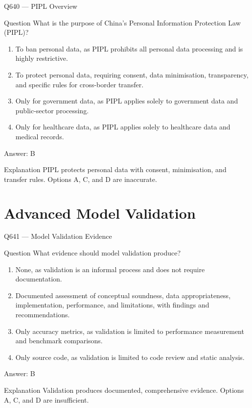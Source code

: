 \documentclass[aspectratio=169,8pt]{beamer}
\begin{document}
	\begin{frame}{Q640 --- PIPL Overview}
		\begin{block}{Question}
			What is the purpose of China's Personal Information Protection Law (PIPL)?
			\begin{enumerate}
				\item To ban personal data, as PIPL prohibits all personal data processing and is highly restrictive.
				\item To protect personal data, requiring consent, data minimisation, transparency, and specific rules for cross-border transfer.
				\item Only for government data, as PIPL applies solely to government data and public-sector processing.
				\item Only for healthcare data, as PIPL applies solely to healthcare data and medical records.
			\end{enumerate}
		\end{block}
		\begin{exampleblock}{Answer: B}\end{exampleblock}
		\begin{block}{Explanation}
			PIPL protects personal data with consent, minimisation, and transfer rules. Options A, C, and D are inaccurate.
		\end{block}
	\end{frame}
	
	\section{Advanced Model Validation}
	
	\begin{frame}{Q641 --- Model Validation Evidence}
		\begin{block}{Question}
			What evidence should model validation produce?
			\begin{enumerate}
				\item None, as validation is an informal process and does not require documentation.
				\item Documented assessment of conceptual soundness, data appropriateness, implementation, performance, and limitations, with findings and recommendations.
				\item Only accuracy metrics, as validation is limited to performance measurement and benchmark comparisons.
				\item Only source code, as validation is limited to code review and static analysis.
			\end{enumerate}
		\end{block}
		\begin{exampleblock}{Answer: B}\end{exampleblock}
		\begin{block}{Explanation}
			Validation produces documented, comprehensive evidence. Options A, C, and D are insufficient.
		\end{block}
	\end{frame}
	
\end{document}

